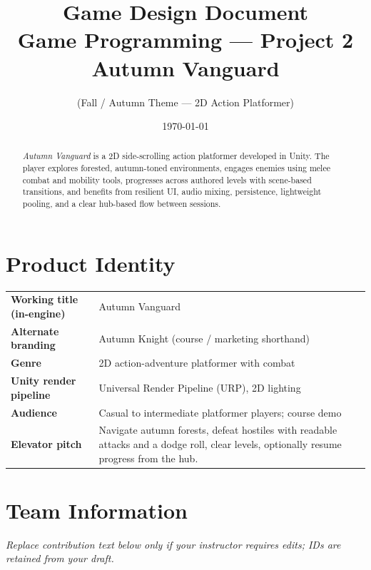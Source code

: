 \documentclass[11pt,a4paper]{article}
\title{\textbf{Game Design Document}\\
       \Large Game Programming --- Project 2\\
       \vspace{0.5em}
       \Huge Autumn Vanguard}
\author{(Fall / Autumn Theme --- 2D Action Platformer)}
\date{\today}
\begin{document}
\maketitle

\begin{abstract}
\noindent
\textit{Autumn Vanguard} is a 2D side-scrolling action platformer developed in Unity. The player explores forested, autumn-toned environments, engages enemies using melee combat and mobility tools, progresses across authored levels with scene-based transitions, and benefits from resilient UI, audio mixing, persistence, lightweight pooling, and a clear hub-based flow between sessions.
\end{abstract}

\section{Product Identity}

\begin{tabular}{@{}ll@{}}
\textbf{Working title (in-engine)} & Autumn Vanguard \\
\textbf{Alternate branding}       & Autumn Knight (course / marketing shorthand) \\
\textbf{Genre}                    & 2D action-adventure platformer with combat \\
\textbf{Unity render pipeline}   & Universal Render Pipeline (URP), 2D lighting \\
\textbf{Audience}                & Casual to intermediate platformer players; course demo \\
\textbf{Elevator pitch}        & Navigate autumn forests, defeat hostiles with readable attacks and a dodge roll, clear levels, optionally resume progress from the hub. \\
\end{tabular}

\section{Team Information}

\noindent
\textit{Replace contribution text below only if your instructor requires edits; IDs are retained from your draft.}
\end{document}
